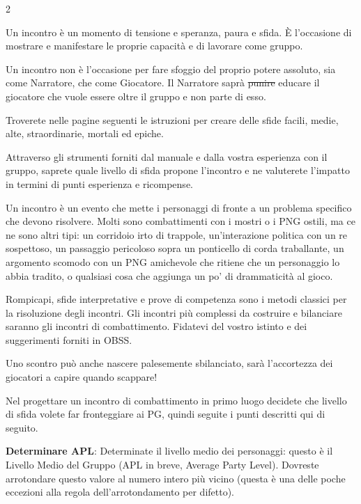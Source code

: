 \begin{multicols}{2}


Un incontro è un momento di tensione e speranza, paura e sfida. È l'occasione di mostrare e manifestare le proprie capacità e di lavorare come gruppo.

Un incontro non è l'occasione per fare sfoggio del proprio potere assoluto, sia come Narratore, che come Giocatore. Il Narratore saprà \st{punire} educare il giocatore che vuole essere oltre il gruppo e non parte di esso.

Troverete nelle pagine seguenti le istruzioni per creare delle sfide facili, medie, alte, straordinarie, mortali ed epiche.

Attraverso gli strumenti forniti dal manuale e dalla vostra esperienza con il gruppo, saprete quale livello di sfida propone l'incontro e ne valuterete l'impatto in termini di punti esperienza e ricompense.

Un incontro è un evento che mette i personaggi di fronte a un problema specifico che devono risolvere. Molti sono combattimenti con i mostri o i PNG ostili, ma ce ne sono altri tipi: un corridoio irto di trappole, un'interazione politica con un re sospettoso, un passaggio pericoloso sopra un ponticello di corda traballante, un argomento scomodo con un PNG amichevole che ritiene che un personaggio lo abbia tradito, o qualsiasi cosa che aggiunga un po' di drammaticità al gioco.

Rompicapi, sfide interpretative e prove di competenza sono i metodi classici per la risoluzione degli incontri. Gli incontri più complessi da costruire e bilanciare saranno gli incontri di combattimento. Fidatevi del vostro istinto e dei suggerimenti forniti in OBSS.

Uno scontro può anche nascere palesemente sbilanciato, sarà l'accortezza dei giocatori a capire quando scappare!

Nel progettare un incontro di combattimento in primo luogo decidete che livello di sfida volete far fronteggiare ai PG, quindi seguite i punti descritti qui di seguito.

\textbf{Determinare APL}: Determinate il livello medio dei personaggi: questo è il Livello Medio del Gruppo (APL in breve, Average Party Level). Dovreste arrotondare questo valore al numero intero più vicino (questa è una delle poche eccezioni alla regola dell'arrotondamento per difetto).



\end{multicols}
